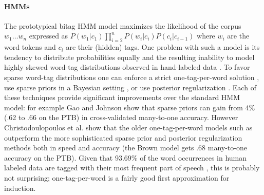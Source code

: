 \paragraph{HMMs}
The prototypical bitag HMM model maximizes the likelihood of the
corpus $w_1 \ldots w_n$ expressed as $P(w_1|c_1)\prod_{i=2}^n
P(w_i|c_i) P(c_i|c_{i-1})$ where $w_i$ are the word tokens and $c_i$
are their (hidden) tags.  One problem with such a model is its
tendency to distribute probabilities equally and the resulting
inability to model highly skewed word-tag distributions observed in
hand-labeled data \cite{johnson:2007:EMNLP-CoNLL2007}.  To favor
sparse word-tag distributions one can enforce a strict
one-tag-per-word solution
\cite{Brown:1992:CNG:176313.176316,Clark:2003:CDM:1067807.1067817},
use sparse priors in a Bayesian setting
\cite{goldwater-griffiths:2007:ACLMain,johnson:2007:EMNLP-CoNLL2007},
or use posterior regularization
\cite{Ganchev:2010:PRS:1859890.1859918}.  Each of these techniques
provide significant improvements over the standard HMM model: for
example Gao and Johnson  show
that sparse priors can gain from 4\% (.62 to .66 on the PTB) in
cross-validated many-to-one accuracy.  However Christodoulopoulos et
al.  show that
the older one-tag-per-word models such as
\cite{Brown:1992:CNG:176313.176316} outperform the more sophisticated
sparse prior and posterior regularization methods both in speed and
accuracy (the Brown model gets .68 many-to-one accuracy on the PTB).
Given that 93.69\% of the word occurrences in human labeled data are
tagged with their most frequent part of speech
\cite{Toutanova:2003:FPT:1073445.1073478}, this is probably not
surprising; one-tag-per-word is a fairly good first approximation for
induction.



